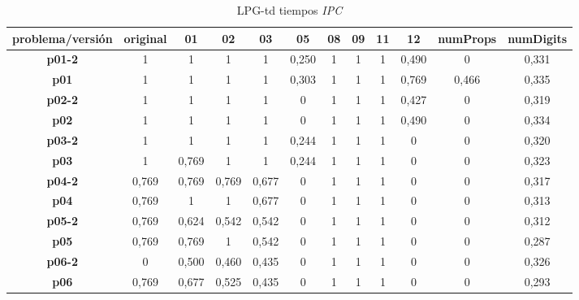 \documentclass{article}
\begin{document}
    \begin{landscape}
    \begin{table}[]
    \centering
    \caption{LPG-td tiempos \textit{IPC}}
    \label{my-label}
    \begin{tabular}{|c|c|c|c|c|c|c|c|c|c|c|c|}
    \hline
    \textbf{problema/versión} & \textbf{original} & \textbf{01}    & \textbf{02}    & \textbf{03}    & \textbf{05}    & \textbf{08}    & \textbf{09}    & \textbf{11}    & \textbf{12}    & \textbf{numProps} & \textbf{numDigits} \\ \hline
    \textbf{p01-2}  &  1      &  1      &  1      &  1      &  0,250  &  1      &  1      &  1      &  0,490  &  0      &  0,331 \\ \hline
    \textbf{p01}    &  1      &  1      &  1      &  1      &  0,303  &  1      &  1      &  1      &  0,769  &  0,466  &  0,335 \\ \hline
    \textbf{p02-2}  &  1      &  1      &  1      &  1      &  0      &  1      &  1      &  1      &  0,427  &  0      &  0,319 \\ \hline
    \textbf{p02}    &  1      &  1      &  1      &  1      &  0      &  1      &  1      &  1      &  0,490  &  0      &  0,334 \\ \hline
    \textbf{p03-2}  &  1      &  1      &  1      &  1      &  0,244  &  1      &  1      &  1      &  0      &  0      &  0,320 \\ \hline
    \textbf{p03}    &  1      &  0,769  &  1      &  1      &  0,244  &  1      &  1      &  1      &  0      &  0      &  0,323 \\ \hline
    \textbf{p04-2}  &  0,769  &  0,769  &  0,769  &  0,677  &  0      &  1      &  1      &  1      &  0      &  0      &  0,317 \\ \hline
    \textbf{p04}    &  0,769  &  1      &  1      &  0,677  &  0      &  1      &  1      &  1      &  0      &  0      &  0,313 \\ \hline
    \textbf{p05-2}  &  0,769  &  0,624  &  0,542  &  0,542  &  0      &  1      &  1      &  1      &  0      &  0      &  0,312 \\ \hline
    \textbf{p05}    &  0,769  &  0,769  &  1      &  0,542  &  0      &  1      &  1      &  1      &  0      &  0      &  0,287 \\ \hline
    \textbf{p06-2}  &  0      &  0,500  &  0,460  &  0,435  &  0      &  1      &  1      &  1      &  0      &  0      &  0,326 \\ \hline
    \textbf{p06}    &  0,769  &  0,677  &  0,525  &  0,435  &  0      &  1      &  1      &  1      &  0      &  0      &  0,293 \\ \hline

\end{tabular}
\end{table}
\end{landscape}
\end{document}

